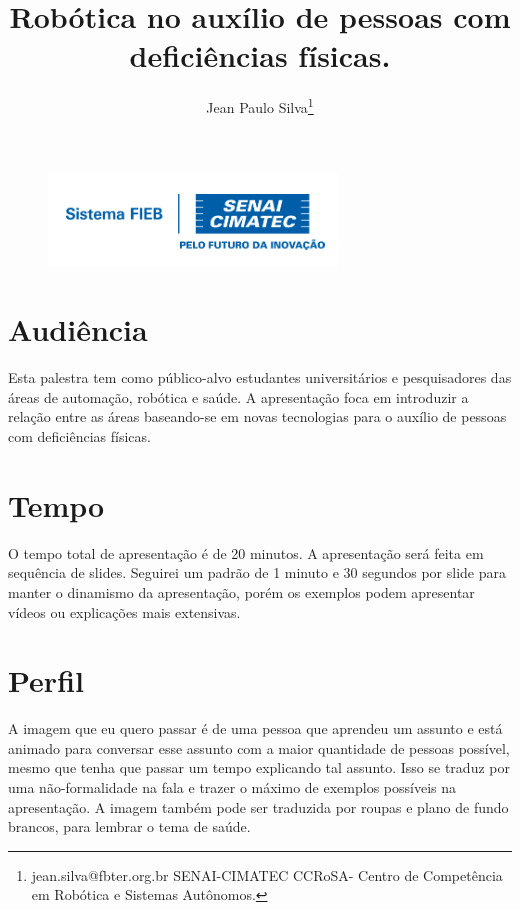 \documentclass[12pt,a4paper]{article}
\begin{document}
 
\begin{figure}
    \flushright
    \includegraphics[scale=0.5]{Logo_senai.png}
\end{figure}

\title{Robótica no auxílio de pessoas com deficiências físicas.}
\author{Jean Paulo Silva\thanks{jean.silva@fbter.org.br SENAI-CIMATEC  CCRoSA- Centro de Competência em Robótica e Sistemas Autônomos.}}
 
 

    \maketitle
    \singlespacing


    \section{Audiência}

    Esta palestra tem como público-alvo estudantes universitários e pesquisadores das áreas de automação, robótica e saúde. A apresentação foca em introduzir a relação entre as áreas baseando-se em novas tecnologias para o auxílio de pessoas com deficiências físicas.

    \section{Tempo}
    O tempo total de apresentação é de 20 minutos. A apresentação será feita em sequência de slides. Seguirei um padrão de 1 minuto e 30 segundos por slide para manter o dinamismo da apresentação, porém os exemplos podem apresentar vídeos ou explicações mais extensivas.

    \section{Perfil}
    A imagem que eu quero passar é de uma pessoa que aprendeu um assunto e está animado para conversar esse assunto com a maior quantidade de pessoas possível, mesmo que tenha que passar um tempo explicando tal assunto. Isso se traduz por uma não-formalidade na fala e trazer o máximo de exemplos possíveis na apresentação. A imagem também pode ser traduzida por roupas e plano de fundo brancos, para lembrar o tema de saúde.
\end{document}
